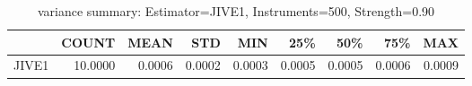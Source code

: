\begin{table}[ht]
\centering
\caption{variance summary: Estimator=JIVE1, Instruments=500, Strength=0.90}
\begin{tabular}{lrrrrrrrr}
\toprule
 & COUNT & MEAN & STD & MIN & 25\% & 50\% & 75\% & MAX \\
\midrule
JIVE1 & 10.0000 & 0.0006 & 0.0002 & 0.0003 & 0.0005 & 0.0005 & 0.0006 & 0.0009 \\
\bottomrule
\end{tabular}
\end{table}
